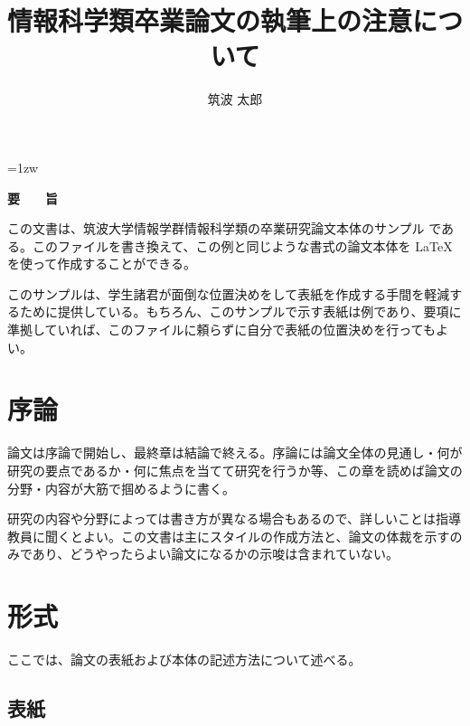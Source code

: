 \documentclass[a4paper,11pt]{jreport}
\title{情報科学類卒業論文の執筆上の注意について}
\author{筑波 太郎}
\begin{document}
\maketitle
\thispagestyle{empty}
\newpage

\thispagestyle{empty}
\vspace*{20pt plus 1fil}
\parindent=1zw
\noindent
\begin{center}
{\Large \bf 要　　旨}
\vspace{2cm}
\end{center}
この文書は、筑波大学情報学群情報科学類の卒業研究論文本体のサンプル
である。このファイルを書き換えて、この例と同じような書式の論文本体を
\LaTeX を使って作成することができる。

このサンプルは、学生諸君が面倒な位置決めをして表紙を作成する手間を軽減す
るために提供している。もちろん、このサンプルで示す表紙は例であり、要項に
準拠していれば、このファイルに頼らずに自分で表紙の位置決めを行ってもよい。

\par
\vspace{0pt plus 1fil}
\newpage

\tableofcontents
\listoffigures

\pagebreak \setcounter{page}{1}


\chapter{序論}

論文は序論で開始し、最終章は結論で終える。序論には論文全体の見通し・何が
研究の要点であるか・何に焦点を当てて研究を行うか等、この章を読めば論文の
分野・内容が大筋で掴めるように書く。

研究の内容や分野によっては書き方が異なる場合もあるので、詳しいことは指導
教員に聞くとよい。この文書は主にスタイルの作成方法と、論文の体裁を示すの
みであり、どうやったらよい論文になるかの示唆は含まれていない。




\chapter{形式}

ここでは、論文の表紙および本体の記述方法について述べる。

\section{表紙}
\end{document}

